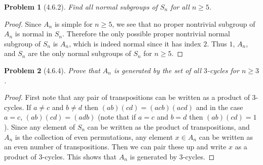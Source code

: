\documentclass{article}
\newtheorem{problem}{Problem}
\begin{document}

\begin{problem}[4.6.2]
Find all normal subgroups of $S_n$ for all $n \geq 5$.
\end{problem}
\begin{proof}
Since $A_n$ is simple for $n \geq 5$, we see that no proper nontrivial subgroup of $A_n$ is normal in $S_n$. Therefore the only possible proper nontrivial normal subgroup of $S_n$ is $A_n$, which is indeed normal since it has index $2$. Thus $1$, $A_n$, and $S_n$ are the only normal subgroups of $S_n$ for $n \geq 5$.
\end{proof}

\begin{problem}[4.6.4]
Prove that $A_n$ is generated by the set of all $3$-cycles for $n \geq 3$.
\end{problem}
\begin{proof}
First note that any pair of transpositions can be written as a product of $3$-cycles. If $a \neq c$ and $b \neq d$ then $(ab)(cd) = (acb)(acd)$ and in the case $a = c$, $(ab)(cd) = (adb)$ (note that if $a = c$ and $b=d$ then $(ab)(cd) = 1$). Since any element of $S_n$ can be written as the product of transpositions, and $A_n$ is the collection of even permutations, any element $x \in A_n$ can be written as an even number of transpositions. Then we can pair these up and write $x$ as a product of $3$-cycles. This shows that $A_n$ is generated by $3$-cycles.
\end{proof}
\end{document}
